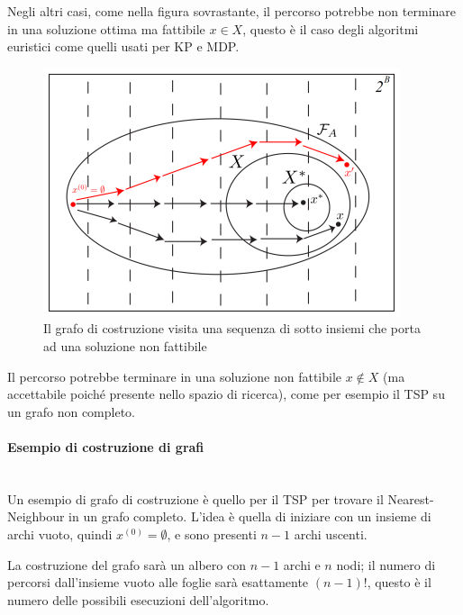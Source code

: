 \documentclass{article}
\begin{document}
Negli altri casi, come nella figura sovrastante, il percorso potrebbe non terminare in una soluzione
ottima ma fattibile $x\in X$, questo è il caso degli algoritmi euristici come quelli usati per
KP e MDP.
\begin{figure}[H]
    \centering
    \includegraphics[scale=0.8]{images/cons_graph_2.png}
    \caption{Il grafo di costruzione visita una sequenza di sotto insiemi che porta ad una soluzione non fattibile}
\end{figure}
Il percorso potrebbe terminare in una soluzione non fattibile $x\notin X$ (ma accettabile poiché presente
nello spazio di ricerca), come per esempio il TSP su un grafo non completo.

\paragraph{Esempio di costruzione di grafi}\mbox{}\\
Un esempio di grafo di costruzione è quello per il TSP per trovare il Nearest-Neighbour in
un grafo completo. L'idea è quella di iniziare con un insieme di archi vuoto, quindi $x^{(0)}=\emptyset$,
e sono presenti $n-1$ archi uscenti.

La costruzione del grafo sarà un albero con $n-1$ archi e $n$ nodi; il numero di percorsi dall'insieme
vuoto alle foglie sarà esattamente $(n-1)!$, questo è il numero delle possibili esecuzioni
dell'algoritmo.
\end{document}
